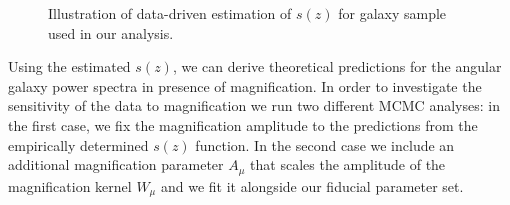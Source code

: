 \documentclass[a4paper,11pt]{article}
\begin{document}
    \begin{figure}
      \begin{center}
        \caption{Illustration of data-driven estimation of $s(z)$ for galaxy sample used in our analysis.} 
        \label{fig:s-func-estimation}
      \end{center}
    \end{figure}

    Using the estimated $s(z)$, we can derive theoretical predictions for the angular galaxy power spectra in presence of magnification. In order to investigate the sensitivity of the data to magnification we run two different MCMC analyses: in the first case, we fix the magnification amplitude to the predictions from the empirically determined $s(z)$ function. In the second case we include an additional magnification parameter $A_{\mu}$ that scales the amplitude of the magnification kernel $W_{\mu}$ and we fit it alongside our fiducial parameter set.
\end{document}
